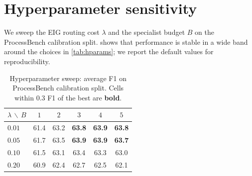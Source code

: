 \documentclass[11pt,a4paper]{article}
\theoremstyle{plain}
\theoremstyle{definition}
\theoremstyle{remark}
\begin{document}
\section{Hyperparameter sensitivity}
\label{app:hparam}

We sweep the EIG routing cost $\lambda$ and the specialist budget
$B$ on the ProcessBench calibration split.
 shows that performance is stable in a wide
band around the choices in \cref{tab:hparams}; we report the
default values for reproducibility.

\begin{table}[H]
\centering
\caption{Hyperparameter sweep: average F1 on ProcessBench
calibration split. Cells within $0.3$ F1 of the best are
\textbf{bold}.}
\label{tab:hparam-sweep}
\small
\begin{tabular}{lccccc}
\toprule
$\lambda \,\backslash\, B$ & $1$ & $2$ & $3$ & $4$ & $5$ \\
\midrule
$0.01$ & 61.4 & 63.2 & \textbf{63.8} & \textbf{63.9} & \textbf{63.8} \\
$0.05$ & 61.7 & 63.5 & \textbf{63.9} & \textbf{63.9} & \textbf{63.7} \\
$0.10$ & 61.5 & 63.1 & 63.4 & 63.3 & 63.0 \\
$0.20$ & 60.9 & 62.4 & 62.7 & 62.5 & 62.1 \\
\bottomrule
\end{tabular}
\end{table}
\end{document}
